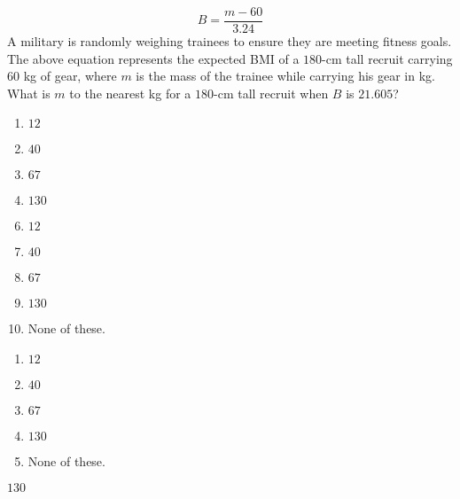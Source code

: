  
$$ B=\frac{m-60}{3.24}$$
A military is randomly weighing trainees to ensure they are meeting fitness goals.  The above equation represents the expected BMI of a $180$-cm tall recruit carrying $60$ kg of gear, where $m$ is the mass of the trainee while carrying his gear in kg.  What is $m$ to the nearest kg for a $180$-cm tall recruit when $B$ is $21.605$?   


\ifsat
	\begin{enumerate}[label=\Alph*)]
		\item $12 $ 
		\item $40 $ 
		\item $67 $ 
		\item $130 $ %
	\end{enumerate}
\else
\fi

\ifacteven
	\begin{enumerate}[label=\textbf{\Alph*.},itemsep=\fill,align=left]
		\setcounter{enumii}{5}
		\item $12 $ 
		\item $40 $ 
		\item $67 $ 
		\addtocounter{enumii}{1}
		\item $130 $ %
		\item None of these. 
	\end{enumerate}
\else
\fi

\ifactodd
	\begin{enumerate}[label=\textbf{\Alph*.},itemsep=\fill,align=left]
		\item $12 $ 
		\item $40 $ 
		\item $67 $ 
		\item $130 $ %
		\item None of these. 
	\end{enumerate}
\else
\fi

\ifgridin
 $130 $ %

\else
\fi

